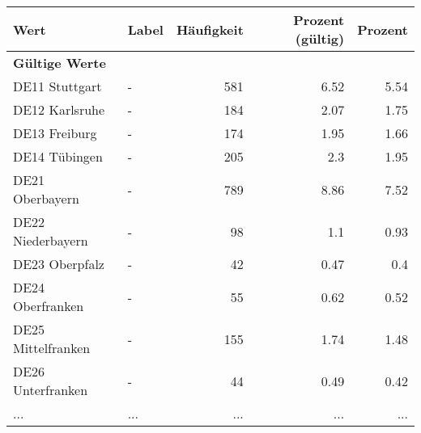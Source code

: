      \begin{longtable}{Xlrrr}
     \toprule
     \textbf{Wert} & \textbf{Label} & \textbf{Häufigkeit} & \textbf{Prozent (gültig)} & \textbf{Prozent} \\
     \endhead
     \midrule
     \multicolumn{5}{l}{\textbf{Gültige Werte}}\\
        \multicolumn{1}{X}{DE11 Stuttgart} & - & \num{581} & \num[round-mode=places,round-precision=2]{6.52} & \num[round-mode=places,round-precision=2]{5.54} \\
        \multicolumn{1}{X}{DE12 Karlsruhe} & - & \num{184} & \num[round-mode=places,round-precision=2]{2.07} & \num[round-mode=places,round-precision=2]{1.75} \\
        \multicolumn{1}{X}{DE13 Freiburg} & - & \num{174} & \num[round-mode=places,round-precision=2]{1.95} & \num[round-mode=places,round-precision=2]{1.66} \\
        \multicolumn{1}{X}{DE14 Tübingen} & - & \num{205} & \num[round-mode=places,round-precision=2]{2.3} & \num[round-mode=places,round-precision=2]{1.95} \\
        \multicolumn{1}{X}{DE21 Oberbayern} & - & \num{789} & \num[round-mode=places,round-precision=2]{8.86} & \num[round-mode=places,round-precision=2]{7.52} \\
        \multicolumn{1}{X}{DE22 Niederbayern} & - & \num{98} & \num[round-mode=places,round-precision=2]{1.1} & \num[round-mode=places,round-precision=2]{0.93} \\
        \multicolumn{1}{X}{DE23 Oberpfalz} & - & \num{42} & \num[round-mode=places,round-precision=2]{0.47} & \num[round-mode=places,round-precision=2]{0.4} \\
        \multicolumn{1}{X}{DE24 Oberfranken} & - & \num{55} & \num[round-mode=places,round-precision=2]{0.62} & \num[round-mode=places,round-precision=2]{0.52} \\
        \multicolumn{1}{X}{DE25 Mittelfranken} & - & \num{155} & \num[round-mode=places,round-precision=2]{1.74} & \num[round-mode=places,round-precision=2]{1.48} \\
        \multicolumn{1}{X}{DE26 Unterfranken} & - & \num{44} & \num[round-mode=places,round-precision=2]{0.49} & \num[round-mode=places,round-precision=2]{0.42} \\
       ... & ... & ... & ... & ... \\

\end{longtable}

